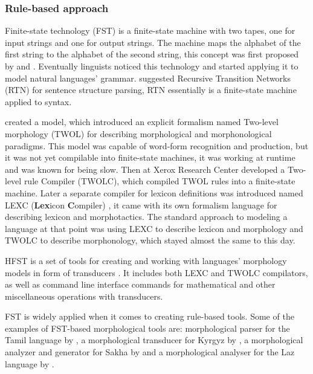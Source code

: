 \subsubsection{Rule-based approach}
\par Finite-state technology (FST) is a finite-state machine with two tapes, one for input strings and one for output strings. The machine maps the alphabet of the first string to the alphabet of the second string, this concept was first proposed by \textcite{mealy_method_1955} and \textcite{moore_gedanken_1955}. Eventually linguists noticed this technology and started applying it to model natural languages' grammar. \textcite{woods_trans_1970} suggested Recursive Transition Networks (RTN) for sentence structure parsing, RTN essentially is a finite-state machine applied to syntax. 
\par \textcite{koskenniemi_twol_1983} created a model, which introduced an explicit formalism named Two-level morphology (TWOL) for describing morphological and morphonological paradigms. This model was capable of word-form recognition and production, but it was not yet compilable into finite-state machines, it was working at runtime and was known for being slow. Then \textcite{karttunen_twolc_1987} at Xerox Research Center developed a Two-level rule Compiler (TWOLC), which compiled TWOL rules into a finite-state machine. Later a separate compiler for lexicon definitions was introduced named LEXC (\textbf{Lex}icon \textbf{C}ompiler) \parencite{karttunen_lexc_1993}, it came with its own formalism language for describing lexicon and morphotactics. The standard approach to modeling a language at that point was using LEXC to describe lexicon and morphology and TWOLC to describe morphonology, which stayed almost the same to this day. 
\par {}
\par HFST is a set of tools for creating and working with languages' morphology models in form of transducers \parencite{linden_hfst_2009}. It includes both LEXC and TWOLC compilators, as well as command line interface commands for mathematical and other miscellaneous operations with transducers. 
\par {}
\par FST is widely applied when it comes to creating rule-based tools. Some of the examples of FST-based morphological tools are: morphological parser for the Tamil language by \textcite{sarveswaran_morph_2021}, a morphological transducer for Kyrgyz by \textcite{washington_finite_2012}, a morphological analyzer and generator for Sakha by \textcite{ivanova_free_2022} and a morphological analyser for the Laz language by \textcite{onal_building_2019}.
